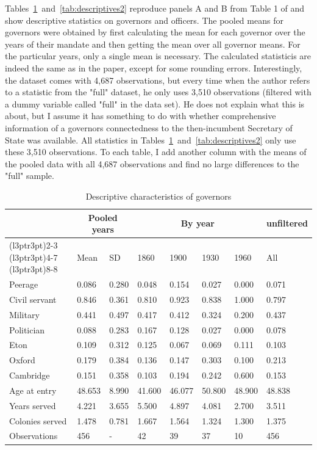 \documentclass[a4paper]{article}\usepackage[]{graphicx}\usepackage[]{xcolor}
\begin{document}
\hspace*{5mm} Tables~\ref{tab:descriptives1}~and~\ref{tab:descriptives2} reproduce panels A and B from Table 1 of \cite{guoxu2018} and show descriptive statistics on governors and officers. The pooled means for governors were obtained by first calculating the mean for each governor over the years of their mandate and then getting the mean over all governor means. For the particular years, only a single mean is necessary. The calculated statisticis are indeed the same as in the paper, except for some rounding errors. Interestingly, the dataset comes with 4,687 observations, but every time when the author refers to a statistic from the "full" dataset, he only uses 3,510 observations (filtered with a dummy variable called "full" in the data set). He does not explain what this is about, but I assume it has something to do with whether comprehensive information of a governors connectedness to the then-incumbent Secretary of State was available. All statistics in Tables~\ref{tab:descriptives1}~and~\ref{tab:descriptives2} only use these 3,510 observations. To each table, I add another column with the means of the pooled data with all 4,687 observations and find no large differences to the "full" sample.   
\begin{table}[!h]
\centering\centering\centering
\caption{\label{tab:descriptives1}Descriptive characteristics of governors}
\centering
\fontsize{7}{9}\selectfont
\begin{tabular}[t]{llllllll}
\toprule
\multicolumn{1}{c}{ } & \multicolumn{2}{c}{Pooled years} & \multicolumn{4}{c}{By year} & \multicolumn{1}{c}{unfiltered} \\
\cmidrule(l{3pt}r{3pt}){2-3} \cmidrule(l{3pt}r{3pt}){4-7} \cmidrule(l{3pt}r{3pt}){8-8}
  & Mean & SD & 1860 & 1900 & 1930 & 1960 & All\\
\midrule
Peerage & 0.086 & 0.280 & 0.048 & 0.154 & 0.027 & 0.000 & 0.071\\
Civil servant & 0.846 & 0.361 & 0.810 & 0.923 & 0.838 & 1.000 & 0.797\\
Military & 0.441 & 0.497 & 0.417 & 0.412 & 0.324 & 0.200 & 0.437\\
Politician & 0.088 & 0.283 & 0.167 & 0.128 & 0.027 & 0.000 & 0.078\\
Eton & 0.109 & 0.312 & 0.125 & 0.067 & 0.069 & 0.111 & 0.103\\
Oxford & 0.179 & 0.384 & 0.136 & 0.147 & 0.303 & 0.100 & 0.213\\
Cambridge & 0.151 & 0.358 & 0.103 & 0.194 & 0.242 & 0.600 & 0.153\\
Age at entry & 48.653 & 8.990 & 41.600 & 46.077 & 50.800 & 48.900 & 48.838\\
Years served & 4.221 & 3.655 & 5.500 & 4.897 & 4.081 & 2.700 & 3.511\\
Colonies served & 1.478 & 0.781 & 1.667 & 1.564 & 1.324 & 1.300 & 1.375\\
Observations & 456 & - & 42 & 39 & 37 & 10 & 456\\
\bottomrule
\end{tabular}
\end{table}
\end{document}
